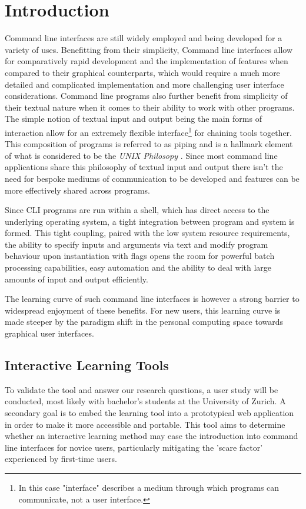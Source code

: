 \chapter{Introduction}
\label{chap:intro}

Command line interfaces are still widely employed and being developed for a
variety of uses. Benefitting from their simplicity, Command line interfaces
allow for comparatively rapid development and the implementation of features
when compared to their graphical counterparts, which would require a much more
detailed and complicated implementation and more challenging user interface
considerations. Command line programs also further benefit from simplicity of
their textual nature when it comes to their ability to work with other
programs. The simple notion of textual input and output being the main forms of
interaction allow for an extremely flexible interface\footnote{In this case
	"interface" describes a medium through which programs can communicate, not
	a user interface.} for chaining tools together. This composition of
programs is referred to as piping and is a hallmark element of what is
considered to be the \textit{UNIX Philosopy} \cite{mcilroy1978unix}. Since
most command line applications share this philosophy of textual input and output
there isn't the need for bespoke mediums of communication to be developed and
features can be more effectively shared across programs.

Since CLI programs are run within a shell, which has direct access to the
underlying operating system, a tight integration between program and system is
formed. This tight coupling, paired with the low system resource requirements,
the ability to specify inputs and arguments via text and modify program
behaviour upon instantiation with flags opens the room for powerful batch
processing capabilities, easy automation and the ability to deal with large
amounts of input and output efficiently.

The learning curve of such command line interfaces is however a strong barrier
to widespread enjoyment of these benefits. For new users, this learning curve
is made steeper by the paradigm shift in the personal computing space towards
graphical user interfaces.


\section{Interactive Learning Tools}

To validate the tool and answer our research questions, a user study will be
conducted, most likely with bachelor's students at the University of Zurich. A
secondary goal is to embed the learning tool into a prototypical web
application in order to make it more accessible and portable. This tool aims to
determine whether an interactive learning method may ease the introduction into
command line interfaces for novice users, particularly mitigating the 'scare
factor' experienced by first-time users.

